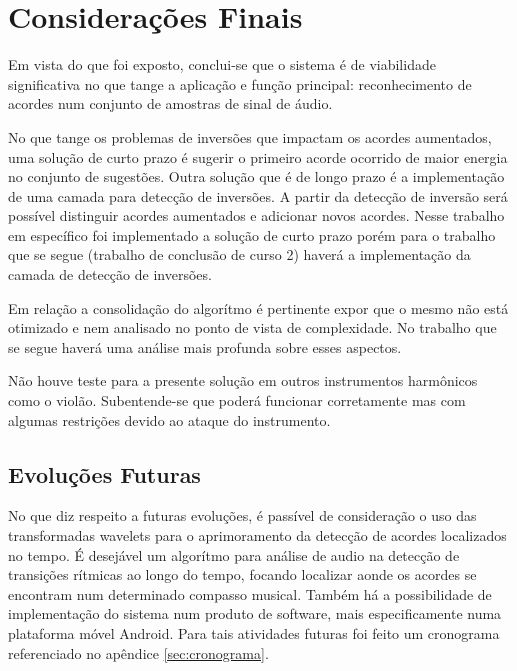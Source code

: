 \chapter{Considerações Finais}
\label{chap:conclusoes}

Em vista do que foi exposto, conclui-se que o sistema é de viabilidade significativa no que tange a aplicação e função principal: reconhecimento de acordes num conjunto de amostras de sinal de áudio.

No que tange os problemas de inversões que impactam os acordes aumentados, uma solução de curto prazo é sugerir o primeiro acorde ocorrido de maior energia no conjunto de sugestões. Outra solução que é de longo prazo é a implementação de uma camada para detecção de inversões. A partir da detecção de inversão será possível distinguir acordes aumentados e adicionar novos acordes. Nesse trabalho em específico foi implementado a solução de curto prazo porém para o trabalho que se segue (trabalho de conclusão de curso 2) haverá a implementação da camada de detecção de inversões.

Em relação a consolidação do algorítmo é pertinente expor que o mesmo não está otimizado e nem analisado no ponto de vista de complexidade. No trabalho que se segue haverá uma análise mais profunda sobre esses aspectos.

Não houve teste para a presente solução em outros instrumentos harmônicos como o violão. Subentende-se que poderá funcionar corretamente mas com algumas restrições devido ao ataque do instrumento.

\section{Evoluções Futuras}
\label{sec:precondicoes}

No que diz respeito a futuras evoluções, é passível de consideração o uso das transformadas wavelets para o aprimoramento da detecção de acordes localizados no tempo. É desejável um algorítmo para análise de audio na detecção de transições rítmicas ao longo do tempo, focando localizar aonde os acordes se encontram num determinado compasso musical. Também há a possibilidade de implementação do sistema num produto de software, mais especificamente numa plataforma móvel Android. Para tais atividades futuras foi feito um cronograma referenciado no apêndice \ref{sec:cronograma}.